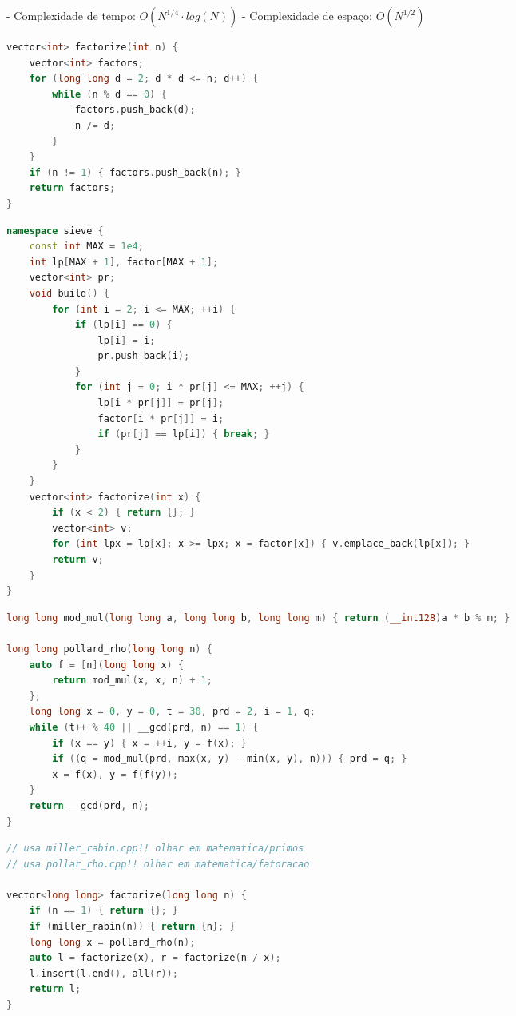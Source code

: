 \documentclass[11pt, a4paper, twoside]{article}
\begin{document}
- Complexidade de tempo: $O(N^{1/4} \cdot log(N))$
- Complexidade de espaço: $O(N^{1/2})$

\begin{multicols}{2}
\begin{lstlisting}[language=C++]
vector<int> factorize(int n) {
    vector<int> factors;
    for (long long d = 2; d * d <= n; d++) {
        while (n % d == 0) {
            factors.push_back(d);
            n /= d;
        }
    }
    if (n != 1) { factors.push_back(n); }
    return factors;
}
\end{lstlisting}
\end{multicols}

\begin{lstlisting}[language=C++]
namespace sieve {
    const int MAX = 1e4;
    int lp[MAX + 1], factor[MAX + 1];
    vector<int> pr;
    void build() {
        for (int i = 2; i <= MAX; ++i) {
            if (lp[i] == 0) {
                lp[i] = i;
                pr.push_back(i);
            }
            for (int j = 0; i * pr[j] <= MAX; ++j) {
                lp[i * pr[j]] = pr[j];
                factor[i * pr[j]] = i;
                if (pr[j] == lp[i]) { break; }
            }
        }
    }
    vector<int> factorize(int x) {
        if (x < 2) { return {}; }
        vector<int> v;
        for (int lpx = lp[x]; x >= lpx; x = factor[x]) { v.emplace_back(lp[x]); }
        return v;
    }
}
\end{lstlisting}

\begin{lstlisting}[language=C++]
long long mod_mul(long long a, long long b, long long m) { return (__int128)a * b % m; }

long long pollard_rho(long long n) {
    auto f = [n](long long x) {
        return mod_mul(x, x, n) + 1;
    };
    long long x = 0, y = 0, t = 30, prd = 2, i = 1, q;
    while (t++ % 40 || __gcd(prd, n) == 1) {
        if (x == y) { x = ++i, y = f(x); }
        if ((q = mod_mul(prd, max(x, y) - min(x, y), n))) { prd = q; }
        x = f(x), y = f(f(y));
    }
    return __gcd(prd, n);
}
\end{lstlisting}

\begin{multicols}{2}
\begin{lstlisting}[language=C++]
// usa miller_rabin.cpp!! olhar em matematica/primos
// usa pollar_rho.cpp!! olhar em matematica/fatoracao

vector<long long> factorize(long long n) {
    if (n == 1) { return {}; }
    if (miller_rabin(n)) { return {n}; }
    long long x = pollard_rho(n);
    auto l = factorize(x), r = factorize(n / x);
    l.insert(l.end(), all(r));
    return l;
}
\end{lstlisting}
\end{multicols}
\end{document}
